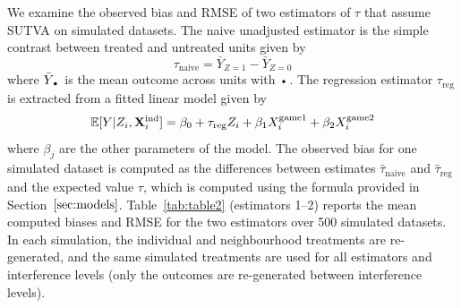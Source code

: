 \documentclass[10pt]{article}
\begin{document}
We examine the observed bias and RMSE of two estimators of $\tau$ that assume SUTVA on simulated datasets. The naive unadjusted estimator is the simple contrast between treated and untreated units given by
\[
\tau_\text{naive} = \bar{Y}_{Z=1} - \bar{Y}_{Z=0}
\]
where $\bar{Y}_{\argdot}$ is the mean outcome across units with $\argdot$. The regression estimator $\tau_\text{reg}$ \parencite{Imbens:2015} is extracted from a fitted linear model given by
\[
\mathbb{E}[Y|Z_i,\mathbf{X}^{\text{ind}}_i] = \beta_0 + \tau_\text{reg}Z_i + \beta_1X_i^\text{game1} + \beta_2X_i^\text{game2}
\]
where $\beta_j$ are the other parameters of the model. The observed bias for one simulated dataset is computed as the differences between estimates $\hat{\tau}_\text{naive}$ and $\hat{\tau}_\text{reg}$ and the expected value $\tau$, which is computed using the formula provided in Section~$\ref{sec:models}$. Table~\ref{tab:table2} (estimators 1--2) reports the mean computed biases and RMSE for the two estimators over 500 simulated datasets. In each simulation, the individual and neighbourhood treatments are re-generated, and the same simulated treatments are used for all estimators and interference levels (only the outcomes are re-generated between interference levels).
\\

\end{document}
